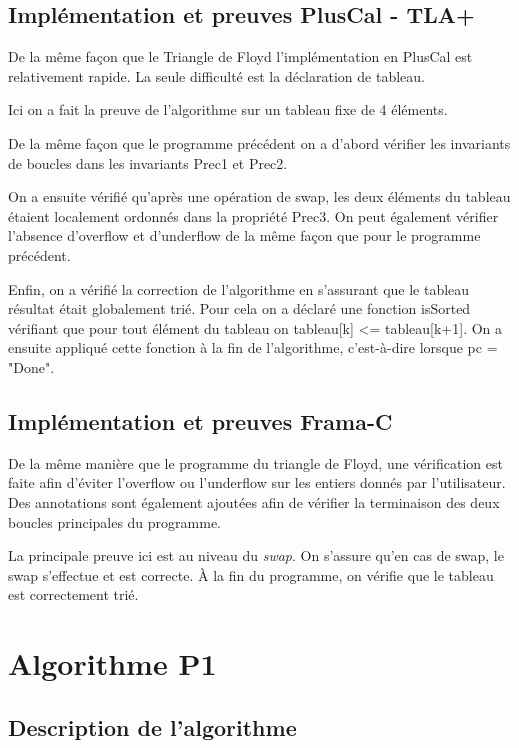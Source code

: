\documentclass[a4paper,11pt, oneside]{book}
\begin{document}
		\section{Implémentation et preuves PlusCal - TLA+}

		De la même façon que le Triangle de Floyd l'implémentation en PlusCal est
		relativement rapide. La seule difficulté est la déclaration de tableau.

		Ici on a fait la preuve de l'algorithme sur un tableau fixe de 4 éléments.

		De la même façon que le programme précédent on a d'abord vérifier les invariants
		de boucles dans les invariants Prec1 et Prec2.

		On a ensuite vérifié qu'après une opération de swap, les deux éléments
		du tableau étaient localement ordonnés dans la propriété Prec3. On peut également
		vérifier l'absence d'overflow et d'underflow de la même façon que pour le programme
		précédent.

		Enfin, on a vérifié la correction de l'algorithme en s'assurant que le tableau
		résultat était globalement trié. Pour cela on a déclaré une fonction isSorted vérifiant
		que pour tout élément du tableau on tableau[k] <= tableau[k+1].
		On a ensuite appliqué cette fonction à la fin de l'algorithme, c'est-à-dire
		lorsque pc = "Done".


		\section{Implémentation et preuves Frama-C}

		De la même manière que le programme du triangle de Floyd, une vérification
		est faite afin d'éviter l'overflow ou l'underflow sur les entiers
		donnés par l'utilisateur. Des annotations sont également ajoutées
		afin de vérifier la terminaison des deux boucles principales du programme.

		\noindent La principale preuve ici est au niveau du \textit{swap}. On s'assure
		qu'en cas de swap, le swap s'effectue et est correcte.
		À la fin du programme, on vérifie que le tableau est correctement trié.


	\chapter{Algorithme P1}

		\section{Description de l'algorithme}
\end{document}
